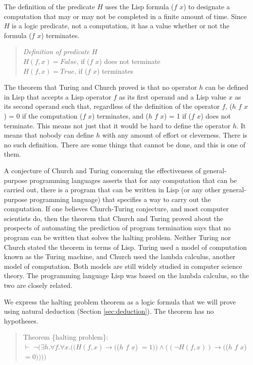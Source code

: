 The definition of the predicate $H$ uses the Lisp
formula ($f$ $x$) to designate a computation that may
or may not be completed in a finite amount of time.
Since $H$ is a logic predicate, not a computation,
it has a value whether or not the formula ($f$ $x$) terminates.
\begin{quote}
\label{def:predicate-H}
\emph{Definition of predicate} $H$\\
\hspace*{3mm}$H(f, x) = False$, if ($f$ $x$) does not terminate\\
\hspace*{3mm}$H(f, x) = True$, if ($f$ $x$) terminates
\end{quote}

The theorem that Turing and Church proved is that
no operator $h$ can be defined in Lisp
that accepts a Lisp operator $f$ as its
first operand and a Lisp value $x$ as its second operand
such that, regardless of the definition of the operator $f$,
($h$ $f$ $x$) = 0 if the computation ($f$ $x$) terminates, and
($h$ $f$ $x$) = 1 if ($f$ $x$) does not terminate.
This means not just that it would be hard to define the operator $h$.
It means that nobody can define $h$ with any amount of effort or cleverness.
There is no such definition.
There are some things that cannot be done, and this is one of them.

\label{church-turing-hypothesis}
A conjecture of Church and Turing
concerning the effectiveness of general-purpose programming languages
asserts that for any computation that can be carried out, there is a program
that can be written in Lisp (or any other general-purpose programming language)
that specifies a way to carry out the computation.
If one believes Church-Turing conjecture, and most computer scientists do,
then the theorem that Church and Turing proved about the prospects of
automating the prediction of program termination
says that no program can be written that solves the halting problem.
Neither Turing nor Church stated the theorem in terms of Lisp.
Turing used a model of computation known as the Turing machine, and
Church used the lambda calculus, another model of computation.
Both models are still widely studied in computer science theory.
The programming language Lisp
was based on the lambda calculus, so the two are closely related.

We express the halting problem theorem as a logic formula that we will prove
using natural deduction (Section \ref{sec:deduction}).
The theorem has no hypotheses.
\begin{quote}
Theorem \{halting problem\}:\\
$\vdash$ $\neg(\exists h. \forall f. \forall x.
((H(f, x) \rightarrow ($($h$ $f$ $x$) $ = 1)) \wedge ((\neg H(f, x)) \rightarrow ($($h$ $f$ $x$) $= 0))))$
\end{quote}

